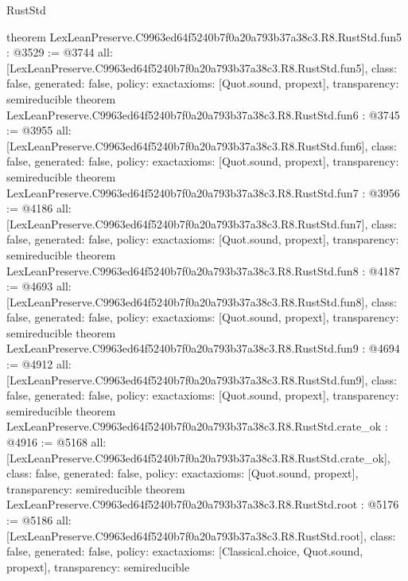 \begin{lexlean}{RustStd}
\begin{coremodule}
{}
theorem LexLeanPreserve.C9963ed64f5240b7f0a20a793b37a38c3.R8.RustStd.fun5 : @3529 := @3744 {
  all: [LexLeanPreserve.C9963ed64f5240b7f0a20a793b37a38c3.R8.RustStd.fun5],
  class: false,
  generated: false,
  policy: exact{axioms: [Quot.sound, propext]},
  transparency: semireducible
}
theorem LexLeanPreserve.C9963ed64f5240b7f0a20a793b37a38c3.R8.RustStd.fun6 : @3745 := @3955 {
  all: [LexLeanPreserve.C9963ed64f5240b7f0a20a793b37a38c3.R8.RustStd.fun6],
  class: false,
  generated: false,
  policy: exact{axioms: [Quot.sound, propext]},
  transparency: semireducible
}
theorem LexLeanPreserve.C9963ed64f5240b7f0a20a793b37a38c3.R8.RustStd.fun7 : @3956 := @4186 {
  all: [LexLeanPreserve.C9963ed64f5240b7f0a20a793b37a38c3.R8.RustStd.fun7],
  class: false,
  generated: false,
  policy: exact{axioms: [Quot.sound, propext]},
  transparency: semireducible
}
theorem LexLeanPreserve.C9963ed64f5240b7f0a20a793b37a38c3.R8.RustStd.fun8 : @4187 := @4693 {
  all: [LexLeanPreserve.C9963ed64f5240b7f0a20a793b37a38c3.R8.RustStd.fun8],
  class: false,
  generated: false,
  policy: exact{axioms: [Quot.sound, propext]},
  transparency: semireducible
}
theorem LexLeanPreserve.C9963ed64f5240b7f0a20a793b37a38c3.R8.RustStd.fun9 : @4694 := @4912 {
  all: [LexLeanPreserve.C9963ed64f5240b7f0a20a793b37a38c3.R8.RustStd.fun9],
  class: false,
  generated: false,
  policy: exact{axioms: [Quot.sound, propext]},
  transparency: semireducible
}
theorem LexLeanPreserve.C9963ed64f5240b7f0a20a793b37a38c3.R8.RustStd.crate_ok : @4916 := @5168 {
  all: [LexLeanPreserve.C9963ed64f5240b7f0a20a793b37a38c3.R8.RustStd.crate_ok],
  class: false,
  generated: false,
  policy: exact{axioms: [Quot.sound, propext]},
  transparency: semireducible
}
theorem LexLeanPreserve.C9963ed64f5240b7f0a20a793b37a38c3.R8.RustStd.root : @5176 := @5186 {
  all: [LexLeanPreserve.C9963ed64f5240b7f0a20a793b37a38c3.R8.RustStd.root],
  class: false,
  generated: false,
  policy: exact{axioms: [Classical.choice, Quot.sound, propext]},
  transparency: semireducible
}


\end{coremodule}
\end{lexlean}
